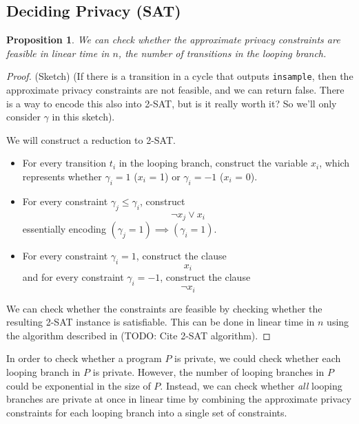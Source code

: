 \documentclass[12pt]{article}
\newtheorem{prop}[thm]{Proposition}
\theoremstyle{definition}
\begin{document}
\subsection{Deciding Privacy (SAT)}

\begin{prop}
    We can check whether the approximate privacy constraints are feasible in linear time in $n$, the number of transitions in the looping branch.
\end{prop}

\begin{proof} (Sketch)
    (If there is a transition in a cycle that outputs \texttt{insample}, then the approximate privacy constraints are not feasible, and we can return false. There is a way to encode this also into 2-SAT, but is it really worth it? So we'll only consider $\gamma$ in this sketch). 
    
    We will construct a reduction to 2-SAT.

    \begin{itemize}
        \item For every transition $t_i$ in the looping branch, construct the variable $x_i$, which represents whether $\gamma_i = 1$ ($x_i$ = 1) or $\gamma_i = -1$ ($x_i$ = 0).
        \item For every constraint $\gamma_j \leq \gamma_i$, construct 
        \begin{equation}
            \lnot x_j \lor x_i
        \end{equation}
        essentially encoding $(\gamma_j = 1) \implies (\gamma_i = 1)$.
        \item For every constraint $\gamma_i = 1$, construct the clause
        \begin{equation}
            x_i
        \end{equation}
        and for every constraint $\gamma_i = -1$, construct the clause
        \begin{equation}
            \lnot x_i
        \end{equation}
    \end{itemize}

    We can check whether the constraints are feasible by checking whether the resulting 2-SAT instance is satisfiable. This can be done in linear time in $n$ using the algorithm described in (TODO: Cite 2-SAT algorithm).
\end{proof}

In order to check whether a program $P$ is private, we could check whether each looping branch in $P$ is private. However, the number of looping branches in $P$ could be exponential in the size of $P$. Instead, we can check whether \textit{all} looping branches are private at once in linear time by combining the approximate privacy constraints for each looping branch into a single set of constraints.
\end{document}
